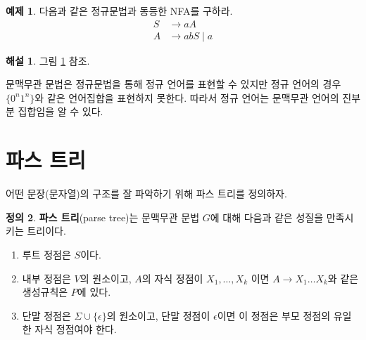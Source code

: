 \documentclass[b5paper, 11pt]{book}
\theoremstyle{definition}
\newtheorem{defn}{정의}[chapter]
\newtheorem{ex}[defn]{예제}
\newtheorem*{ans*}{해설}
\begin{document}
\begin{ex}
   다음과 같은 정규문법과 동등한 NFA를 구하라.
   \begin{align*}
       S & \rightarrow aA \\ 
       A & \rightarrow abS \; \vert \; a 
   \end{align*} 
\end{ex}
\begin{ans*}
    그림 \ref{regular grammar} 참조.
\end{ans*}
\begin{figure}[!ht]
    \centering
    \caption{} 
    \label{regular grammar}
\end{figure}
문맥무관 문법은 정규문법을 통해 정규 언어를 표현할 수 있지만 정규 언어의 경우 $\{0^n1^n\}$와 같은 언어집합을 표현하지 못한다. 따라서 정규 언어는 문맥무관 언어의 진부분 집합임을 알 수 있다. 
\section{파스 트리}
어떤 문장(문자열)의 구조를 잘 파악하기 위해 파스 트리를 정의하자.
\begin{defn}
    \textbf{파스 트리}(parse tree)는 문맥무관 문법 $G$에 대해 다음과 같은 성질을 만족시키는 트리이다.
    \begin{enumerate}
        \item 루트 정점은 $S$이다.
        \item 내부 정점은 $V$의 원소이고, $A$의 자식 정점이 
        $X_1, \ldots, X_k $ 이면
        $A \rightarrow X_1 \ldots X_k$와 같은 생성규칙은 $P$에 있다. 
        \item 단말 정점은 $\Sigma \cup \{\epsilon\}$의 원소이고, 단말 정점이 $\epsilon$이면
        이 정점은 부모 정점의 유일한 자식 정점여야 한다. 
    \end{enumerate}
\end{defn}
\end{document}
